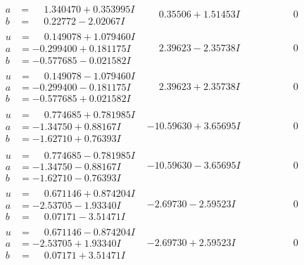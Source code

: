 \documentclass[1p]{elsarticle_modified}
\theoremstyle{definition}
\begin{document}
$$\begin{array}{c|c|c}
\begin{aligned}
a &= \phantom{-}1.340470 + 0.353995 I \\
b &= \phantom{-}0.22772 - 2.02067 I\end{aligned}
 & \phantom{-}0.35506 + 1.51453 I & \phantom{-0.000000 } 0 \\ \hline\begin{aligned}
u &= \phantom{-}0.149078 + 1.079460 I \\
a &= -0.299400 + 0.181175 I \\
b &= -0.577685 - 0.021582 I\end{aligned}
 & \phantom{-}2.39623 - 2.35738 I & \phantom{-0.000000 } 0 \\ \hline\begin{aligned}
u &= \phantom{-}0.149078 - 1.079460 I \\
a &= -0.299400 - 0.181175 I \\
b &= -0.577685 + 0.021582 I\end{aligned}
 & \phantom{-}2.39623 + 2.35738 I & \phantom{-0.000000 } 0 \\ \hline\begin{aligned}
u &= \phantom{-}0.774685 + 0.781985 I \\
a &= -1.34750 + 0.88167 I \\
b &= -1.62710 + 0.76393 I\end{aligned}
 & -10.59630 + 3.65695 I & \phantom{-0.000000 } 0 \\ \hline\begin{aligned}
u &= \phantom{-}0.774685 - 0.781985 I \\
a &= -1.34750 - 0.88167 I \\
b &= -1.62710 - 0.76393 I\end{aligned}
 & -10.59630 - 3.65695 I & \phantom{-0.000000 } 0 \\ \hline\begin{aligned}
u &= \phantom{-}0.671146 + 0.874204 I \\
a &= -2.53705 - 1.93340 I \\
b &= \phantom{-}0.07171 - 3.51471 I\end{aligned}
 & -2.69730 - 2.59523 I & \phantom{-0.000000 } 0 \\ \hline\begin{aligned}
u &= \phantom{-}0.671146 - 0.874204 I \\
a &= -2.53705 + 1.93340 I \\
b &= \phantom{-}0.07171 + 3.51471 I\end{aligned}
 & -2.69730 + 2.59523 I & \phantom{-0.000000 } 0\\

\end{array}$$
\end{document}

